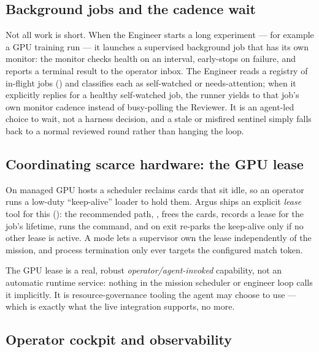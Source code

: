 \subsection{Background jobs and the cadence wait}

Not all work is short. When the Engineer starts a long experiment --- for example a
GPU training run --- it launches a supervised background job that has its own monitor:
the monitor checks health on an interval, early-stops on failure, and reports a
terminal result to the operator inbox. The Engineer reads a registry of in-flight
jobs () and classifies each as
self-watched or needs-attention; when it explicitly replies
 for a healthy self-watched job, the runner yields to that
job's own monitor cadence instead of busy-polling the Reviewer. It is an agent-led
choice to wait, not a harness decision, and a stale or misfired sentinel simply falls
back to a normal reviewed round rather than hanging the loop.

\subsection{Coordinating scarce hardware: the GPU lease}

On managed GPU hosts a scheduler reclaims cards that sit idle, so an operator runs a
low-duty ``keep-alive'' loader to hold them. Argus ships an explicit \emph{lease}
tool for this (): the recommended path,
, frees the cards, records a lease for the job's
lifetime, runs the command, and on exit re-parks the keep-alive only if no other
lease is active. A  mode lets a supervisor own the lease independently
of the mission, and process termination only ever targets the configured match token.

\begin{callout}
The GPU lease is a real, robust \emph{operator/agent-invoked} capability, not an
automatic runtime service: nothing in the mission scheduler or engineer loop calls it
implicitly. It is resource-governance tooling the agent may choose to use --- which is
exactly what the live integration supports, no more.
\end{callout}

\subsection{Operator cockpit and observability}

